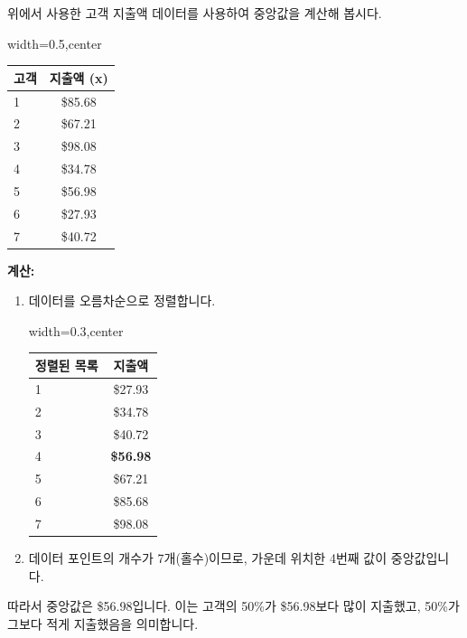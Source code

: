 \documentclass[11pt,a4paper]{article}
\theoremstyle{definition}
\begin{document}
\begin{examplebox}[title=예시: 고객 지출액의 중앙값]
위에서 사용한 고객 지출액 데이터를 사용하여 중앙값을 계산해 봅시다.

\begin{adjustbox}{width=0.5\textwidth,center}
\begin{tabular}{lc}
\toprule
\textbf{고객} & \textbf{지출액 (x)} \\
\midrule
1 & \$85.68 \\
2 & \$67.21 \\
3 & \$98.08 \\
4 & \$34.78 \\
5 & \$56.98 \\
6 & \$27.93 \\
7 & \$40.72 \\
\bottomrule
\end{tabular}
\end{adjustbox}
\label{tab:customer_spending_median}

\textbf{계산:}
\begin{enumerate}
    \item 데이터를 오름차순으로 정렬합니다.
    \begin{adjustbox}{width=0.3\textwidth,center}
    \begin{tabular}{lc}
    \toprule
    \textbf{정렬된 목록} & \textbf{지출액} \\
    \midrule
    1 & \$27.93 \\
    2 & \$34.78 \\
    3 & \$40.72 \\
    4 & \textbf{\$56.98} \\ %
    5 & \$67.21 \\
    6 & \$85.68 \\
    7 & \$98.08 \\
    \bottomrule
    \end{tabular}
    \end{adjustbox}
    \label{tab:customer_spending_ordered}
    \item 데이터 포인트의 개수가 7개(홀수)이므로, 가운데 위치한 4번째 값이 중앙값입니다.
\end{enumerate}
따라서 중앙값은 \$56.98입니다. 이는 고객의 50\%가 \$56.98보다 많이 지출했고, 50\%가 그보다 적게 지출했음을 의미합니다.
\end{examplebox}
\end{document}
